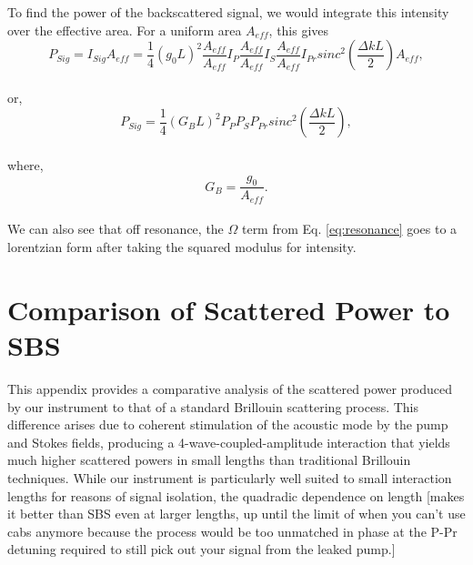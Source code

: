 \documentclass[%
  reprint,
  superscriptaddress,
  amsmath,amssymb,
  aps,
  prapplied,
]{revtex4-2}
\begin{document}
To find the power of the backscattered signal, we would integrate this intensity over the effective area. For a uniform area $A_{eff}$, this gives
\\
\begin{equation}
  P_{Sig} = I_{Sig}A_{eff} = \frac{1}{4}(g_{0}L)^{2}\frac{A_{eff}}{A_{eff}}I_{P}\frac{A_{eff}}{A_{eff}}I_{S}\frac{A_{eff}}{A_{eff}}I_{Pr}sinc^{2}\left(\frac{\Delta kL}{2}\right)A_{eff},
\end{equation}
\\
or,
\\
\begin{equation}
  P_{Sig} = \frac{1}{4}(G_{B}L)^{2}P_{P}P_{S}P_{Pr}sinc^{2}\left(\frac{\Delta kL}{2}\right),
\end{equation}
\\
where,
\\
\begin{equation}
  G_{B} = \frac{g_{0}}{A_{eff}}.
\end{equation}
\\
We can also see that off resonance, the $\Omega$ term from Eq. \ref{eq:resonance} goes to a lorentzian form after taking the squared modulus for intensity.

\newpage


\section{Comparison of Scattered Power to SBS}

This appendix provides a comparative analysis of the scattered power produced by our instrument to that of a standard Brillouin scattering process. This difference arises due to coherent stimulation of the acoustic mode by the pump and Stokes fields, producing a 4-wave-coupled-amplitude interaction that yields much higher scattered powers in small lengths than traditional Brillouin techniques. While our instrument is particularly well suited to small interaction lengths for reasons of signal isolation, the quadradic dependence on length [makes it better than SBS even at larger lengths, up until the limit of when you can't use cabs anymore because the process would be too unmatched in phase at the P-Pr detuning required to still pick out your signal from the leaked pump.]
\end{document}
